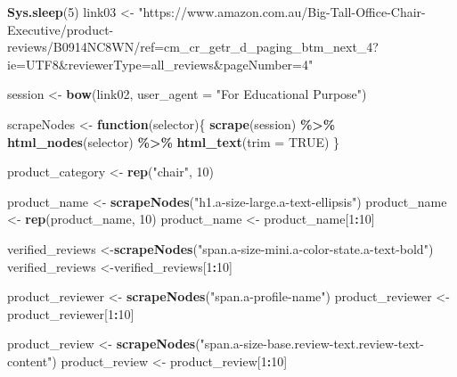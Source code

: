 \documentclass[
]{article}
\newenvironment{Shaded}{\begin{snugshade}}{\end{snugshade}}
\newcommand{\AttributeTok}[1]{\textcolor[rgb]{0.13,0.29,0.53}{#1}}
\newcommand{\ConstantTok}[1]{\textcolor[rgb]{0.56,0.35,0.01}{#1}}
\newcommand{\ControlFlowTok}[1]{\textcolor[rgb]{0.13,0.29,0.53}{\textbf{#1}}}
\newcommand{\DecValTok}[1]{\textcolor[rgb]{0.00,0.00,0.81}{#1}}
\newcommand{\FunctionTok}[1]{\textcolor[rgb]{0.13,0.29,0.53}{\textbf{#1}}}
\newcommand{\NormalTok}[1]{#1}
\newcommand{\OtherTok}[1]{\textcolor[rgb]{0.56,0.35,0.01}{#1}}
\newcommand{\SpecialCharTok}[1]{\textcolor[rgb]{0.81,0.36,0.00}{\textbf{#1}}}
\newcommand{\StringTok}[1]{\textcolor[rgb]{0.31,0.60,0.02}{#1}}
\begin{document}
\begin{Shaded}
\begin{Highlighting}[]
   \FunctionTok{Sys.sleep}\NormalTok{(}\DecValTok{5}\NormalTok{)}
\NormalTok{link03 }\OtherTok{\textless{}{-}} \StringTok{"https://www.amazon.com.au/Big{-}Tall{-}Office{-}Chair{-}Executive/product{-}reviews/B0914NC8WN/ref=cm\_cr\_getr\_d\_paging\_btm\_next\_4?ie=UTF8\&reviewerType=all\_reviews\&pageNumber=4"}


\NormalTok{  session }\OtherTok{\textless{}{-}} \FunctionTok{bow}\NormalTok{(link02,}
               \AttributeTok{user\_agent =} \StringTok{"For Educational Purpose"}\NormalTok{)}

\NormalTok{  scrapeNodes }\OtherTok{\textless{}{-}} \ControlFlowTok{function}\NormalTok{(selector)\{}
    \FunctionTok{scrape}\NormalTok{(session) }\SpecialCharTok{\%\textgreater{}\%}
      \FunctionTok{html\_nodes}\NormalTok{(selector) }\SpecialCharTok{\%\textgreater{}\%}
      \FunctionTok{html\_text}\NormalTok{(}\AttributeTok{trim =} \ConstantTok{TRUE}\NormalTok{)}
\NormalTok{  \}}

\NormalTok{  product\_category }\OtherTok{\textless{}{-}} \FunctionTok{rep}\NormalTok{(}\StringTok{"chair"}\NormalTok{, }\DecValTok{10}\NormalTok{)}

\NormalTok{  product\_name }\OtherTok{\textless{}{-}} \FunctionTok{scrapeNodes}\NormalTok{(}\StringTok{"h1.a{-}size{-}large.a{-}text{-}ellipsis"}\NormalTok{)}
\NormalTok{  product\_name }\OtherTok{\textless{}{-}} \FunctionTok{rep}\NormalTok{(product\_name, }\DecValTok{10}\NormalTok{)}
\NormalTok{  product\_name }\OtherTok{\textless{}{-}}\NormalTok{ product\_name[}\DecValTok{1}\SpecialCharTok{:}\DecValTok{10}\NormalTok{]}
  
\NormalTok{  verified\_reviews }\OtherTok{\textless{}{-}}\FunctionTok{scrapeNodes}\NormalTok{(}\StringTok{"span.a{-}size{-}mini.a{-}color{-}state.a{-}text{-}bold"}\NormalTok{)}
\NormalTok{  verified\_reviews }\OtherTok{\textless{}{-}}\NormalTok{verified\_reviews[}\DecValTok{1}\SpecialCharTok{:}\DecValTok{10}\NormalTok{]}
  
\NormalTok{  product\_reviewer }\OtherTok{\textless{}{-}} \FunctionTok{scrapeNodes}\NormalTok{(}\StringTok{"span.a{-}profile{-}name"}\NormalTok{)}
\NormalTok{  product\_reviewer }\OtherTok{\textless{}{-}}\NormalTok{ product\_reviewer[}\DecValTok{1}\SpecialCharTok{:}\DecValTok{10}\NormalTok{]}
  
\NormalTok{  product\_review }\OtherTok{\textless{}{-}} \FunctionTok{scrapeNodes}\NormalTok{(}\StringTok{"span.a{-}size{-}base.review{-}text.review{-}text{-}content"}\NormalTok{)}
\NormalTok{  product\_review }\OtherTok{\textless{}{-}}\NormalTok{ product\_review[}\DecValTok{1}\SpecialCharTok{:}\DecValTok{10}\NormalTok{]}
  

\end{Highlighting}
\end{Shaded}
\end{document}
